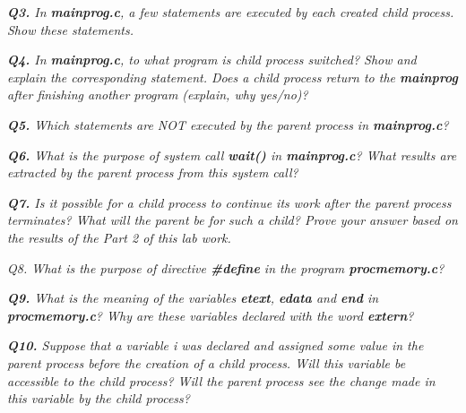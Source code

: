 \documentclass[11pt]{article}
\begin{document}
\vspace{3mm}
\textit{\textbf{Q3.} In \textbf{mainprog.c}, a few statements are executed by each created child process. Show these statements.}
\vspace{3mm}


\vspace{5mm}
\textit{\textbf{Q4.} In \textbf{mainprog.c}, to what program is child process switched? Show and explain the corresponding statement. Does a child process return to the \textbf{mainprog} after finishing another program (explain, why yes/no)?}
\vspace{5mm}


\vspace{5mm}
\textit{\textbf{Q5.} Which statements are NOT executed by the parent process in \textbf{mainprog.c}?}
\vspace{5mm}


\vspace{5mm}
\textit{\textbf{Q6.} What is the purpose of system call \textbf{wait()} in \textbf{mainprog.c}? What results are extracted by the parent process from this system call?}
\vspace{5mm}


\vspace{5mm}
\textit{\textbf{Q7.} Is it possible for a child process to continue its work after the parent process terminates? What will the parent be for such a child? Prove your answer based on the results of the Part 2 of this lab work.}
\vspace{5mm}


\vspace{5mm}
\textit{Q8. What is the purpose of directive \textbf{\#define} in the program \textbf{procmemory.c}?}
\vspace{5mm}


\vspace{5mm}
\textit{\textbf{Q9.} What is the meaning of the variables \textbf{etext}, \textbf{edata} and \textbf{end} in \textbf{procmemory.c}? Why are these variables declared with the word \textbf{extern}?}
\vspace{5mm}


\vspace{5mm}
\textit{\textbf{Q10.} Suppose that a variable i was declared and assigned some value in the parent process before the creation of a child process. Will this variable be accessible to the child process? Will the parent process see the change made in this variable by the child process?}
\vspace{5mm}
\end{document}
